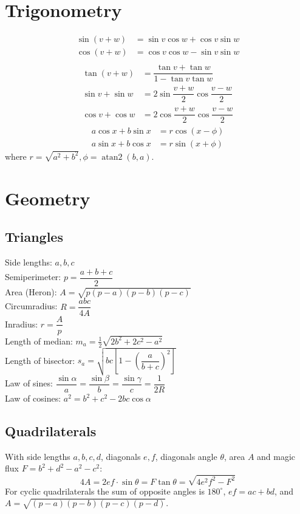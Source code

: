 \section{Trigonometry}
\begin{align*}
\sin(v+w)&{}=\sin v\cos w+\cos v\sin w\\
\cos(v+w)&{}=\cos v\cos w-\sin v\sin w\\
\end{align*}
\begin{align*}
\tan(v+w)&{}=\dfrac{\tan v+\tan w}{1-\tan v\tan w}\\
\sin v+\sin w&{}=2\sin\dfrac{v+w}{2}\cos\dfrac{v-w}{2}\\
\cos v+\cos w&{}=2\cos\dfrac{v+w}{2}\cos\dfrac{v-w}{2}
\end{align*}
\begin{align*}
	a\cos x+b\sin x&=r\cos(x-\phi)\\
	a\sin x+b\cos x&=r\sin(x+\phi)
\end{align*}
where $r=\sqrt{a^2+b^2}, \phi=\operatorname{atan2}(b,a)$.

\section{Geometry}

\subsection{Triangles}
Side lengths: $a,b,c$\\
Semiperimeter: $p=\dfrac{a+b+c}{2}$\\
Area (Heron): $A=\sqrt{p(p-a)(p-b)(p-c)}$\\
Circumradius: $R=\dfrac{abc}{4A}$\\
Inradius: $r=\dfrac{A}{p}$\\
Length of median: $m_a=\tfrac{1}{2}\sqrt{2b^2+2c^2-a^2}$\\
Length of bisector: $s_a=\sqrt{bc\left[1-\left(\dfrac{a}{b+c}\right)^2\right]}$\\
Law of sines: $\dfrac{\sin\alpha}{a}=\dfrac{\sin\beta}{b}=\dfrac{\sin\gamma}{c}=\dfrac{1}{2R}$\\
Law of cosines: $a^2=b^2+c^2-2bc\cos\alpha$

\subsection{Quadrilaterals}
With side lengths $a,b,c,d$, diagonals $e, f$, diagonals angle $\theta$, area $A$ and
magic flux $F=b^2+d^2-a^2-c^2$:
\[ 4A = 2ef \cdot \sin\theta = F\tan\theta = \sqrt{4e^2f^2-F^2} \]
For cyclic quadrilaterals the sum of opposite angles is $180^\circ$,
$ef = ac + bd$, and $A = \sqrt{(p-a)(p-b)(p-c)(p-d)}$.

